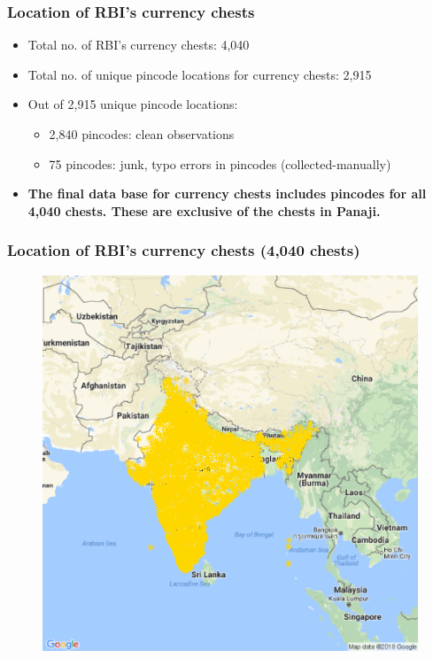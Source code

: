 \documentclass{beamer}\usepackage[]{graphicx}\usepackage[]{color}
\begin{document}
\begin{frame}
  \frametitle{Location of RBI's currency chests}
  \begin{footnotesize}
    \begin{itemize}
    \item Total no. of RBI's currency chests: 4,040
    \item Total no. of unique pincode locations for currency chests: 2,915
    \item Out of 2,915 unique pincode locations:
      \begin{itemize}
      \item 2,840 pincodes: clean observations 
      \item 75 pincodes: junk, typo errors in pincodes (collected-manually)
      \end{itemize}
    \item \textbf{The final data base for currency chests includes pincodes for all 4,040 chests. These are exclusive of the chests in Panaji.}  
    \end{itemize}
  \end{footnotesize}
\end{frame}

\begin{frame}
  \frametitle{Location of RBI's currency chests (4,040 chests)}
  \begin{figure}
    \includegraphics[scale = 0.45]{GRAPHS/india_cc_map.png}
  \end{figure}
\end{frame}
\end{document}
